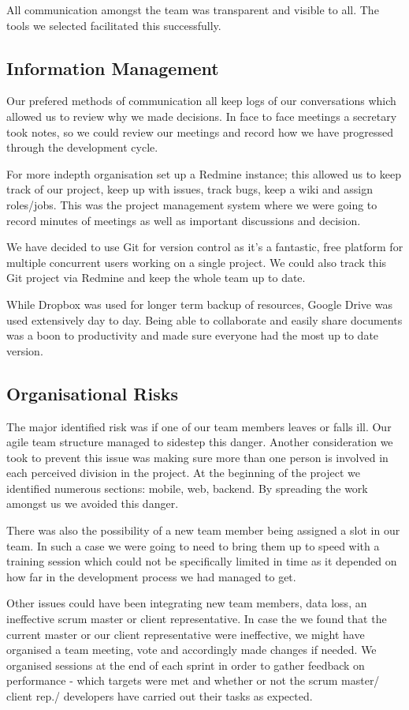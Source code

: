 \documentclass{l3proj}
\begin{document}
All communication amongst the team was transparent and visible to all. The tools we selected facilitated this successfully.

\subsection{Information Management}Our prefered methods of communication all keep logs of our conversations which allowed us to review why we made decisions. In face to face meetings a secretary took notes, so we could review our meetings and record how we have progressed through the development cycle.

For more indepth organisation set up a Redmine instance; this allowed us to keep track of our project, keep up with issues, track bugs, keep a wiki and assign roles/jobs. This was the project management system where we were going to record minutes of meetings as well as important discussions and decision.

We have decided to use \gls{Git} for version control as it’s a fantastic, free platform for multiple concurrent users working on a single project. We could also track this Git project via Redmine and keep the whole team up to date.

While Dropbox was used for longer term backup of resources, Google Drive was used extensively day to day. Being able to collaborate and easily share documents was a boon to productivity and made sure everyone had the most up to date version.

\subsection{Organisational Risks}		The major identified risk was if one of our team members leaves or falls ill. Our agile team structure managed to sidestep this danger. Another consideration we took to prevent this issue was making sure more than one person is involved in each perceived division in the project. At the beginning of the project we identified numerous sections: mobile, web, backend. By spreading the work amongst us we avoided this danger.

There was also the possibility of a new team member being assigned a slot in our team. In such a case we were going to need to bring them up to speed with a training session which could not be specifically limited in time as it depended on how far in the development process we had managed to get.

Other issues could have been integrating new team members, data loss, an ineffective scrum master or client representative. In case the we found that the current master or our client representative were ineffective, we might have organised a team meeting, vote and accordingly made changes if needed. We organised sessions at the end of each sprint in order to gather feedback on performance - which targets were met and whether or not the scrum master/ client rep./ developers have carried out their tasks as expected.
\end{document}
